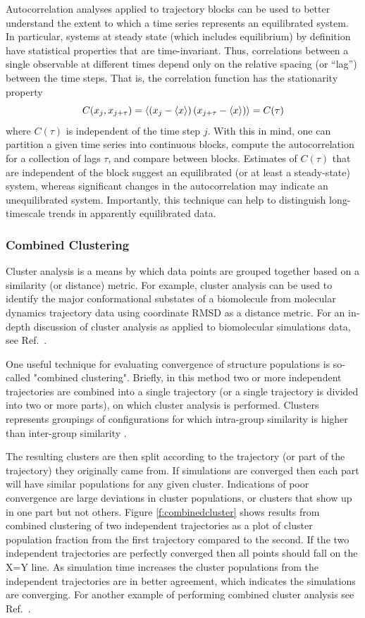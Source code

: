 Autocorrelation analyses applied to trajectory blocks can be used to better understand the extent to which a time series represents an equilibrated system.  In particular, systems at steady state (which includes equilibrium) by definition have statistical properties that are time-invariant.  Thus, correlations between a single observable at different times depend only on the relative spacing (or ``lag'') between the time steps.  That is, the correlation function has the stationarity property
\begin{equation}
 C(x_j,x_{j+\tau}) = \left< \left(x_j - \langle x \rangle \right) \left(x_{j+\tau} - \langle x \rangle \right) \right> = C(\tau)
\end{equation}
where $C(\tau)$ is independent of the time step $j$.  With this in mind, one can partition a given time series into continuous blocks, compute the autocorrelation for a collection of lags $\tau$, and compare between blocks.  Estimates of $C(\tau)$ that are independent of the block suggest an equilibrated (or at least a steady-state) system, whereas significant changes in the autocorrelation may indicate an unequilibrated system.  Importantly, this technique can help to distinguish long-timescale trends in apparently equilibrated data.


\subsubsection*{Combined Clustering}

Cluster analysis is a means by which data points are grouped together based on a similarity (or distance) metric. For example, cluster analysis can be used to identify the major conformational substates of a biomolecule from molecular dynamics trajectory data using coordinate RMSD as a distance metric. For an in-depth discussion of cluster analysis as applied to biomolecular simulations data, see Ref.\ \citep{Shao2007}. 

One useful technique for evaluating convergence of structure populations is so-called "combined clustering". Briefly, in this method two or more independent trajectories are combined into a single trajectory (or a single trajectory is divided into two or more parts), on which cluster analysis is performed. Clusters represents groupings of configurations for which intra-group similarity is higher than inter-group similarity \citep{Okur2006}.

The resulting clusters are then split according to the trajectory (or part of the trajectory) they originally came from. If simulations are converged then each part will have similar populations for any given cluster. Indications of poor convergence are large deviations in cluster populations, or clusters that show up in one part but not others. Figure \ref{f:combinedcluster} shows results from combined clustering of two independent trajectories as a plot of cluster population fraction from the first trajectory compared to the second. If the two independent trajectories are perfectly converged then all points should fall on the X=Y line. As simulation time increases the cluster populations from the independent trajectories are in better agreement, which indicates the simulations are converging. For another example of performing combined cluster analysis see Ref.\ \citep{Bergonzo2014}.
